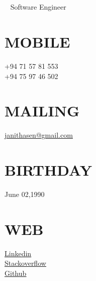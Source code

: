 \documentclass[]{cv-class}
\begin{document}
\begin{aside}
\color{blue}
  \section{}
  	\vspace{0.5cm}
   ~  
      {Software Engineer}
   ~
  \section{MOBILE}
    {\whitebodyfont +94 71 57 81 553\\
    +94 75 97 46 502}
    ~
  \section{MAILING}
    \underline{\href{mailto:janithasen@gmail.com}{{\whitebodyfont janithasen@gmail.com}}}
    ~
  \section{BIRTHDAY}
  	{\whitebodyfont June 02,1990}
    ~   
  \section{WEB}
  	\vspace{0.10cm}
    \underline{\href{https://www.linkedin.com/in/janithamadushan}{{\whitebodyfont Linkedin}}}
    \\
	\vspace{0.10cm}
    \underline{\href{https://stackoverflow.com/users/4412223/janitha-madushan}{{\whitebodyfont Stackoverflow}}}
	\\	
	\vspace{0.10cm}
    \underline{\href{https://github.com/janitham}{{\whitebodyfont Github}}}
    ~

\end{aside}
\end{document}
